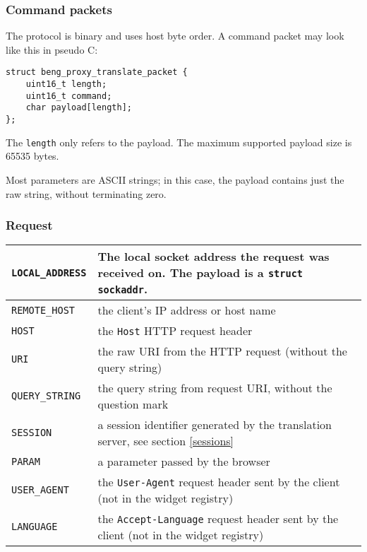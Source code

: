 \documentclass[a4paper,12pt]{article}
\begin{document}
\subsubsection{Command packets}

The protocol is binary and uses host byte order.  A command packet may
look like this in pseudo C:

\begin{verbatim}
struct beng_proxy_translate_packet {
    uint16_t length;
    uint16_t command;
    char payload[length];
};
\end{verbatim}

The \texttt{length} only refers to the payload.  The maximum supported
payload size is 65535 bytes.

Most parameters are ASCII strings; in this case, the payload contains
just the raw string, without terminating zero.

\subsubsection{Request}

\begin{longtable}{|l|p{10cm}|}
\hline

\texttt{LOCAL\_ADDRESS} & The local socket address the request was
received on.  The payload is a \texttt{struct sockaddr}. \\

\hline
\texttt{REMOTE\_HOST} & the client's IP address or host name \\
\hline
\texttt{HOST} & the \texttt{Host} HTTP request header \\
\hline
\texttt{URI} & the raw URI from the HTTP request (without the query
string) \\
\hline

\texttt{QUERY\_STRING} & the query string from request URI, without
the question mark \\

\hline
\texttt{SESSION} & a session identifier generated by the translation
server, see section \ref{sessions} \\
\hline
\texttt{PARAM} & a parameter passed by the browser \\

\hline

\texttt{USER\_AGENT} & the \texttt{User-Agent} request header sent by
the client (not in the widget registry) \\

\hline

\texttt{LANGUAGE} & the \texttt{Accept-Language} request header sent
by the client (not in the widget registry) \\

\hline

\end{longtable}
\end{document}
